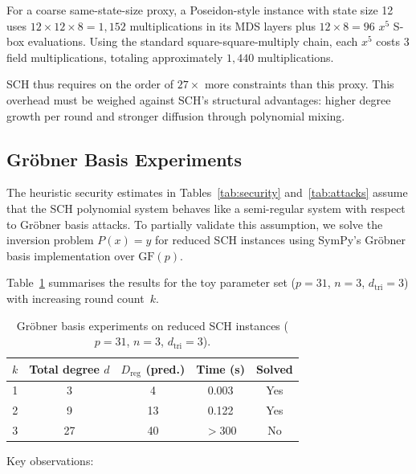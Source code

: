 ﻿\documentclass[english]{aucmcs}
\begin{document}
For a coarse same-state-size proxy, a Poseidon-style instance with state size 12 uses $12 \times 12 \times 8 = 1{,}152$ multiplications in its MDS layers plus $12 \times 8 = 96$ $x^5$ S-box evaluations. Using the standard square-square-multiply chain, each $x^5$ costs 3 field multiplications, totaling approximately $1{,}440$ multiplications.

SCH thus requires on the order of $27\times$ more constraints than this proxy. This overhead must be weighed against SCH's structural advantages: higher degree growth per round and stronger diffusion through polynomial mixing.

\subsection{Gr\"obner Basis Experiments}
\label{sec:groebner-experiments}

The heuristic security estimates in Tables~\ref{tab:security}
and~\ref{tab:attacks} assume that the SCH polynomial system behaves like a
semi-regular system with respect to Gr\"obner basis attacks. To partially
validate this assumption, we solve the inversion problem
$P(x) = y$ for reduced SCH instances using SymPy's Gr\"obner basis
implementation over $\mathrm{GF}(p)$.

Table~\ref{tab:groebner} summarises the results for the toy parameter set
($p=31$, $n=3$, $d_{\mathrm{tri}}=3$) with increasing round count~$k$.

\begin{table}[t]
\centering
\caption{Gr\"obner basis experiments on reduced SCH instances
  ($p=31$, $n=3$, $d_{\mathrm{tri}}=3$).}
\label{tab:groebner}
\begin{tabular}{ccccc}
\toprule
$k$ & Total degree $d$ & $D_{\mathrm{reg}}$ (pred.) & Time (s) & Solved \\
\midrule
1 & 3   & 4  & 0.003  & Yes \\
2 & 9   & 13 & 0.122  & Yes \\
3 & 27  & 40 & $>300$ & No  \\
\bottomrule
\end{tabular}
\end{table}

Key observations:
\end{document}
